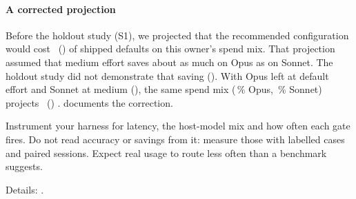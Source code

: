 \paragraph{A corrected projection} Before the holdout study (S1), we projected that the recommended configuration would cost
\AthreeOld\X\ (\AthreeOldBand) of shipped defaults on this owner's spend mix. That projection assumed that medium effort
saves about as much on Opus as on Sonnet. The holdout study did not demonstrate that saving (\SHFourRatio\X). With Opus left at default effort and
Sonnet at medium (\EcRatio\X), the same spend mix (\AthreeOpusShare\,\% Opus, \AthreeSonnetShare\,\% Sonnet) projects
\AthreeNew\X\ (\AthreeNewBand) \expl. \Thesupp{} documents the correction.

\begin{keyidea}[title={For practitioners}]
Instrument your harness for latency, the host-model mix and how often each gate fires. Do not read accuracy or
savings from it: measure those with labelled cases and paired sessions. Expect real usage to route less often than a
benchmark suggests.
\end{keyidea}

Details: .
